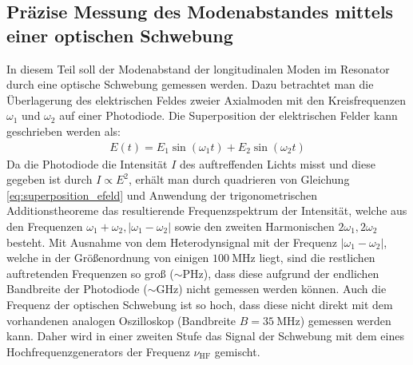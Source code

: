 \documentclass[11pt, a4paper]{article}
\numberwithin{equation}{section}
\begin{document}
\subsection{Präzise Messung des Modenabstandes mittels einer optischen Schwebung}
In diesem Teil soll der Modenabstand der longitudinalen Moden im Resonator durch eine optische Schwebung gemessen werden.
Dazu betrachtet man die Überlagerung des elektrischen Feldes zweier Axialmoden mit den Kreisfrequenzen $\omega_1$ und $\omega_2$ auf einer Photodiode.
Die Superposition der elektrischen Felder kann geschrieben werden als:
\begin{align}
	E(t) = E_1 \sin(\omega_1 t) + E_2 \sin(\omega_2 t)
	\label{eq:superposition_efeld}
\end{align}
Da die Photodiode die Intensität $I$ des auftreffenden Lichts misst und diese gegeben ist durch $I \propto E^2$, erhält man durch quadrieren von Gleichung \ref{eq:superposition_efeld} und Anwendung der trigonometrischen Additionstheoreme das resultierende Frequenzspektrum der Intensität, welche aus den Frequenzen $\omega_1 + \omega_2, |\omega_1 - \omega_2|$ sowie den zweiten Harmonischen $2\omega_1, 2\omega_2$ besteht.
Mit Ausnahme von dem Heterodynsignal mit der Frequenz $|\omega_1 - \omega_2|$, welche in der Größenordnung von einigen $\SI{100}{\mega\hertz}$ liegt, sind die restlichen auftretenden Frequenzen so groß ($\sim \si{\peta\hertz}$), dass diese aufgrund der endlichen Bandbreite der Photodiode ($\sim \si{\giga\hertz}$) nicht gemessen werden können.
Auch die Frequenz der optischen Schwebung ist so hoch, dass diese nicht direkt mit dem vorhandenen analogen Oszilloskop (Bandbreite $B = \SI{35}{\mega\hertz}$) gemessen werden kann.
Daher wird in einer zweiten Stufe das Signal der Schwebung mit dem eines Hochfrequenzgenerators der Frequenz $\nu_\mathrm{HF}$ gemischt.
\end{document}
